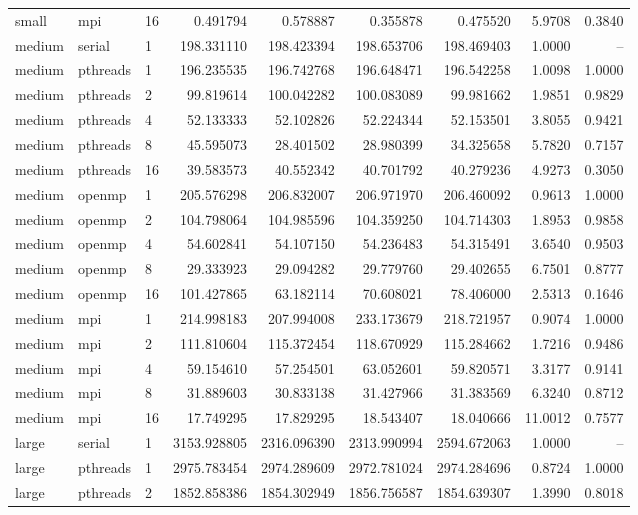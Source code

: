 \begin{longtable}{lllrrrrrr}
small & mpi & 16 & 0.491794 & 0.578887 & 0.355878 & 0.475520 & 5.9708 & 0.3840 \\
medium & serial & 1 & 198.331110 & 198.423394 & 198.653706 & 198.469403 & 1.0000 & -- \\
medium & pthreads & 1 & 196.235535 & 196.742768 & 196.648471 & 196.542258 & 1.0098 & 1.0000 \\
medium & pthreads & 2 & 99.819614 & 100.042282 & 100.083089 & 99.981662 & 1.9851 & 0.9829 \\
medium & pthreads & 4 & 52.133333 & 52.102826 & 52.224344 & 52.153501 & 3.8055 & 0.9421 \\
medium & pthreads & 8 & 45.595073 & 28.401502 & 28.980399 & 34.325658 & 5.7820 & 0.7157 \\
medium & pthreads & 16 & 39.583573 & 40.552342 & 40.701792 & 40.279236 & 4.9273 & 0.3050 \\
medium & openmp & 1 & 205.576298 & 206.832007 & 206.971970 & 206.460092 & 0.9613 & 1.0000 \\
medium & openmp & 2 & 104.798064 & 104.985596 & 104.359250 & 104.714303 & 1.8953 & 0.9858 \\
medium & openmp & 4 & 54.602841 & 54.107150 & 54.236483 & 54.315491 & 3.6540 & 0.9503 \\
medium & openmp & 8 & 29.333923 & 29.094282 & 29.779760 & 29.402655 & 6.7501 & 0.8777 \\
medium & openmp & 16 & 101.427865 & 63.182114 & 70.608021 & 78.406000 & 2.5313 & 0.1646 \\
medium & mpi & 1 & 214.998183 & 207.994008 & 233.173679 & 218.721957 & 0.9074 & 1.0000 \\
medium & mpi & 2 & 111.810604 & 115.372454 & 118.670929 & 115.284662 & 1.7216 & 0.9486 \\
medium & mpi & 4 & 59.154610 & 57.254501 & 63.052601 & 59.820571 & 3.3177 & 0.9141 \\
medium & mpi & 8 & 31.889603 & 30.833138 & 31.427966 & 31.383569 & 6.3240 & 0.8712 \\
medium & mpi & 16 & 17.749295 & 17.829295 & 18.543407 & 18.040666 & 11.0012 & 0.7577 \\
large & serial & 1 & 3153.928805 & 2316.096390 & 2313.990994 & 2594.672063 & 1.0000 & -- \\
large & pthreads & 1 & 2975.783454 & 2974.289609 & 2972.781024 & 2974.284696 & 0.8724 & 1.0000 \\
large & pthreads & 2 & 1852.858386 & 1854.302949 & 1856.756587 & 1854.639307 & 1.3990 & 0.8018 \\

\end{longtable}
